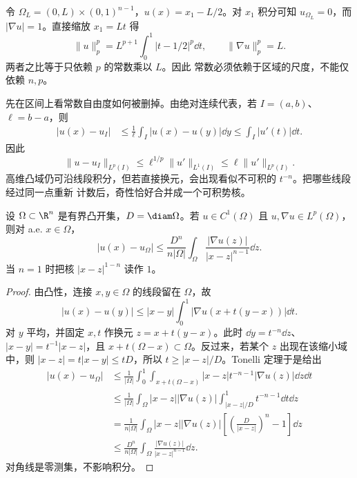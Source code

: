 \begin{example}[长盒上的尺度依赖]\label{ex:4-3-3-long-box}
令 $\Omega_L=(0,L)\times(0,1)^{n-1}$，$u(x)=x_1-L/2$。对 $x_1$ 积分可知
$u_{\Omega_L}=0$，而 $|\nabla u|=1$。直接缩放 $x_1=Lt$ 得
\[
 \|u\|_p^p=L^{p+1}\int_0^1|t-1/2|^p\dd t,\qquad
 \|\nabla u\|_p^p=L.
\]
两者之比等于只依赖 $p$ 的常数乘以 $L$。因此 \Poincare{} 常数必须依赖于区域的尺度，不能仅依赖
$n,p$。
\end{example}

先在区间上看常数自由度如何被删掉。由绝对连续代表，若 $I=(a,b)$、$\ell=b-a$，则
\begin{align*}
 |u(x)-u_I|
 &\leq\frac1\ell\int_I|u(x)-u(y)|\dd y
 \leq\int_I|u'(t)|\dd t.
\end{align*}
因此
\begin{equation}\label{eq:4-3-interval-poincare}
 \|u-u_I\|_{L^p(I)}
 \leq \ell^{1/p}\|u'\|_{L^1(I)}
 \leq \ell\|u'\|_{L^p(I)}.
\end{equation}
高维凸域仍可沿线段积分，但若直接换元，会出现看似不可积的 $t^{-n}$。把哪些线段经过同一点重新
计数后，奇性恰好合并成一个可积势核。

\begin{lemma}[凸域中的势核估计]\label{lemma:4-3-3-convex-potential}
设 $\Omega\subset\R^n$ 是有界凸开集，$D=\diam\Omega$。若
$u\in C^1(\Omega)$ 且 $u,\nabla u\in L^p(\Omega)$，则对 a.e. $x\in\Omega$，
\[
 |u(x)-u_\Omega|
 \leq \frac{D^n}{n|\Omega|}
 \int_\Omega\frac{|\nabla u(z)|}{|x-z|^{n-1}}\dd z.
 \tag{4.3.11}\label{eq:4-3-convex-potential}
\]
当 $n=1$ 时把核 $|x-z|^{1-n}$ 读作 $1$。
\end{lemma}

\begin{proof}
由凸性，连接 $x,y\in\Omega$ 的线段留在 $\Omega$，故
\[
 |u(x)-u(y)|
 \leq |x-y|\int_0^1|\nabla u(x+t(y-x))|\dd t.
\]
对 $y$ 平均，并固定 $x,t$ 作换元 $z=x+t(y-x)$。此时
$\dd y=t^{-n}\dd z$、$|x-y|=t^{-1}|x-z|$，且
$x+t(\Omega-x)\subset\Omega$。反过来，若某个 $z$ 出现在该缩小域中，则
$|x-z|=t|x-y|\leq tD$，所以 $t\geq|x-z|/D$。Tonelli 定理于是给出
\begin{align*}
 |u(x)-u_\Omega|
 &\leq\frac1{|\Omega|}\int_0^1
   \int_{x+t(\Omega-x)}|x-z|t^{-n-1}|\nabla u(z)|\dd z\dd t\\
 &\leq\frac1{|\Omega|}\int_\Omega |x-z||\nabla u(z)|
   \int_{|x-z|/D}^1t^{-n-1}\dd t\dd z\\
 &=\frac1{n|\Omega|}\int_\Omega |x-z||\nabla u(z)|
   \left[\left(\frac{D}{|x-z|}\right)^n-1\right]\dd z\\
 &\leq\frac{D^n}{n|\Omega|}
   \int_\Omega\frac{|\nabla u(z)|}{|x-z|^{n-1}}\dd z.
\end{align*}
对角线是零测集，不影响积分。
\end{proof}

